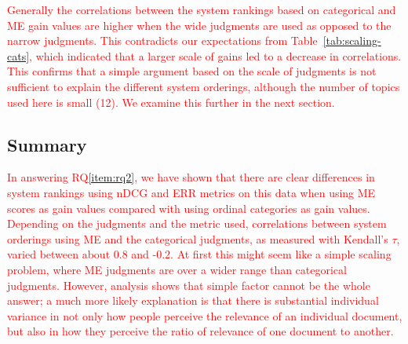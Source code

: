 \textcolor{red}{ Generally the correlations between the system rankings
based on categorical and ME gain values are higher when the wide
judgments are used as opposed to the narrow judgments.
This contradicts our expectations from Table~\ref{tab:scaling-cats},
which indicated that a larger scale of gains led to a decrease in
correlations.
This confirms that a simple argument based on the scale of judgments is
not sufficient to explain the different system orderings, although the
number of topics used here is small (12).
We examine this further in the next section.
} 



\subsection{Summary}
\label{sec:summary-7}

\textcolor{red}{ In answering RQ\ref{item:rq2}, we have shown that
there are clear differences in system rankings using nDCG and ERR
metrics on this data when using ME scores as gain values compared with
using ordinal categories as gain values.
Depending on the judgments and the metric used, correlations between
system orderings using ME and the categorical judgments, as measured
with Kendall's $\tau$, varied between about 0.8 and -0.2. At first this
might seem like a simple scaling problem, where ME judgments are over
a wider range than categorical judgments.
However, analysis shows that simple factor cannot be the whole answer;
a much more likely explanation is that there is substantial individual
variance in not only how people perceive the relevance of an individual
document, but also in how they perceive the ratio of relevance of one
document to another.
} 
 


